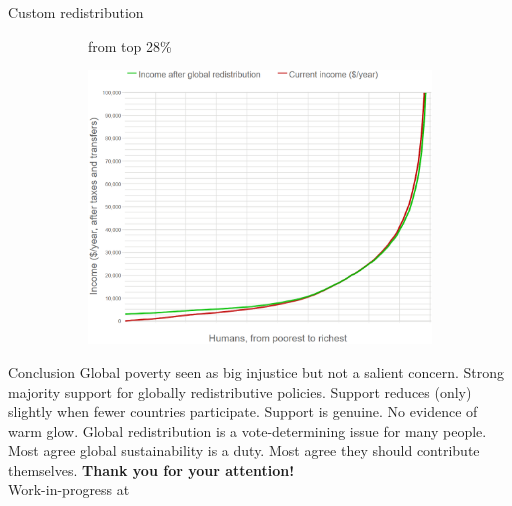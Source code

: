 \documentclass[aspectratio=169,xcolor=dvipsnames, 11pt,mathserif]{beamer}
\begin{document}
\begin{frame}{Custom redistribution \href{run:survey_custom_redistr.mp4}{} \href{https://bit.ly/custom_redistr}{}}
{\begin{figure}
      \begin{subfigure}{.2\textwidth}
        \bbs \ip {}
        \ip {} from top 28\% 
        \ee
      \end{subfigure}\begin{subfigure}{.8\textwidth}
        \includegraphics[height=.8\textheight]{../figures/mean_custom_redistr/all_satisfied.png}
      \end{subfigure}
    \end{figure}}
\end{frame}

\begin{frame}{Conclusion}
\bbsp
\ip Global poverty seen as big injustice but not a salient concern.
\ip Strong majority support for globally redistributive policies.
\ip Support reduces (only) slightly when fewer countries participate.
\ip Support is genuine. No evidence of warm glow.
\ip Global redistribution is a vote-determining issue for many people. %
\ip Most agree global sustainability is a duty.
\ip Most agree they should contribute themselves.
\ip \centering \textbf{Thank you for your attention!} \\ \centering  Work-in-progress at 
\ee
\end{frame}
\end{document}
